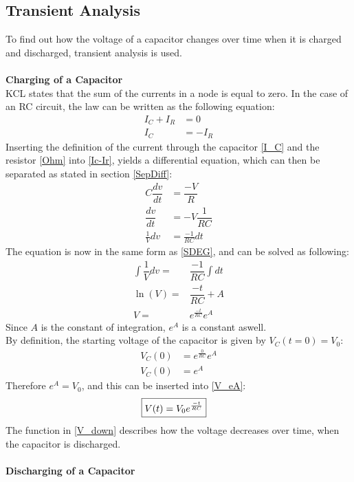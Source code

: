 \subsection{Transient Analysis}
\label{sec371}
To find out how the voltage of a capacitor changes over time when it is charged and discharged, transient analysis is used.
\\
\\
\textbf{Charging of a Capacitor}\\
KCL states that the sum of the currents in a node is equal to zero. In the case of an RC circuit, the law can be written as the following equation:
\begin{align}
I_{C}+I_{R}&=0 \nonumber \\
I_{C}&= -I_{R} \label{Ic-Ir}
\end{align}
Inserting the definition of the current through the capacitor \eqref{I_C} and the resistor \eqref{Ohm} into \eqref{Ic-Ir}, yields a differential equation, which can then be separated as stated in section \ref{SepDiff}:
\begin{align*}
C \dfrac{dv}{dt}&=\dfrac{-V}{R} \\
\dfrac{dv}{dt} &= -V\dfrac{1}{RC} \\
\frac{1}{V}dv &= \frac{-1}{RC}dt
\end{align*}
The equation is now in the same form as \eqref{SDEG}, and can be solved as following:
\begin{align}
\int \dfrac{1}{V}dv =& \dfrac{-1}{RC} \int dt\nonumber \\
\ln(V) =& \dfrac{-t}{RC} + A \nonumber\\
V =& e^{\frac{-t}{RC}}e^{A}\label{V_eA}
\end{align}
Since $A$ is the constant of integration, $e^A$ is a constant aswell.
\\
By definition, the starting voltage of the capacitor is given by $V_C(t=0)=V_0$:
 \begin{align*}
	V_C(0) &= e^{\frac{0}{RC}}e^A\\
	V_C(0) &= e^A
 \end{align*}
Therefore $e^A = V_0$, and this can be inserted into \eqref{V_eA}:
\begin{align}
\label{V_down}
\Aboxed{
 V(t) = V_0e^{\frac{-t}{RC}}
 }
\end{align}
The function in \eqref{V_down} describes how the voltage decreases over time, when the capacitor is discharged.
\\
\\
\textbf{Discharging of a Capacitor}\\
